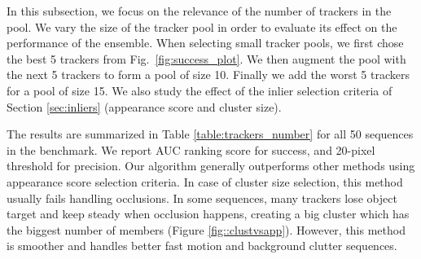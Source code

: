 In this subsection, we focus on the relevance of the number of trackers in the pool.
We vary the size of the tracker pool in order to evaluate its effect on the
performance of the ensemble.
When selecting small tracker pools, we first chose the best 5 trackers
from Fig.~\ref{fig:success_plot}. We then augment the pool with the next 5 trackers to
form a pool of size 10. Finally we add the worst 5 trackers for a pool of size 15.
We also study the effect of the inlier selection criteria of Section
\ref{sec:inliers}
(appearance score and cluster size).

\begin{table}[h!]
\centering
\caption{\small Average AUC and precision for live fusion methods tested in 50 videos
		dataset.}
\label{table:trackers_number}
\end{table}

The results are summarized in Table \ref{table:trackers_number} for all 50
sequences in the benchmark.
We report AUC ranking score for success, 
and 20-pixel threshold for precision.
%
%
Our algorithm generally outperforms other methods using
appearance score selection criteria. In case of cluster size selection,
this method usually fails handling occlusions. In some sequences, many trackers
lose object target and keep steady when occlusion happens, creating a big
cluster which has the biggest number of members (Figure \ref{fig::clustvsapp}).
However, this method is smoother and handles better fast motion and background
clutter sequences.

